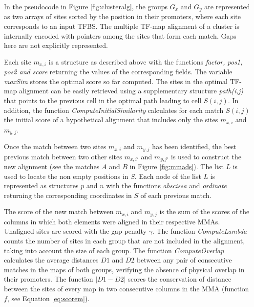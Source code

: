
In the pseudocode in Figure \ref{fig:clusteralg}, the groups $G_x$ and $G_y$ are represented as
two arrays of sites sorted by the position in their promoters, where each 
site corresponds to an input TFBS. The multiple TF-map alignment of a cluster 
is internally encoded with pointers among the sites that form each match. 
Gaps here are not explicitly represented. 

Each site $m_{x,i}$ is a structure as described above with the functions 
\emph{factor, pos1, pos2 and score} returning the values of the corresponding fields. 
The variable \emph{maxSim} stores the optimal score so far computed.
The sites in the optimal TF-map alignment can be easily retrieved using
a supplementary structure \emph{path(i,j)} that points to the previous
cell in the optimal path leading to cell $S(i,j)$. In addition, the 
function \emph{ComputeInitialSimilarity} calculates for each match 
$S(i,j)$ the initial score of a hypothetical alignment that includes only 
the sites $m_{x,i}$ and $m_{y,j}$.

Once the match between two sites $m_{x,i}$ and $m_{y,j}$ has been identified,
the best previous match between two other sites $m_{x,i'}$ and $m_{y,j'}$ is
used to construct the new alignment (see the matches $A$ and $B$ in Figure
\ref{fig:mmads}). The list $L$ is used to locate the non empty positions in $S$.
Each node of the list $L$ is represented as structures $p$ and $n$ 
with the functions \emph{abscissa} and \emph{ordinate} returning the 
corresponding coordinates in $S$ of each previous match. 

The score of the new match between $m_{x,i}$ and $m_{y,j}$ is the sum of 
the scores of the columns in which both elements were aligned in their respective 
MMAs. Unaligned sites are scored with the gap penalty $\gamma$.
The function \emph{ComputeLambda} counts the number of sites
in each group that are not included in the alignment, taking into
account the size of each group. The function \emph{ComputeOverlap} calculates the 
average distances $D1$ and $D2$ between any pair of consecutive matches in the maps of 
both groups, verifying the absence of physical overlap in their promoters.
The function $|D1-D2|$ scores the conservation of distance between the sites of every 
map in two consecutive columns in the MMA (function $f$, see Equation \ref{eq:scorem}).



